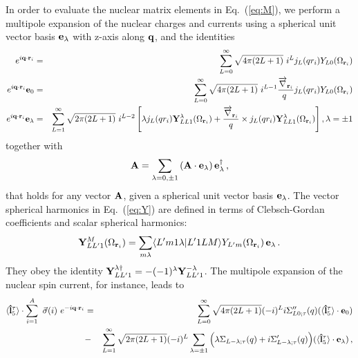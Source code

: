 \documentclass[11pt,a4paper]{article}
\begin{document}
In order to evaluate the nuclear matrix elements in Eq.~(\ref{eq:M}), we perform a multipole expansion of the nuclear charges and currents using a spherical unit vector basis ${\bf {e}}_\lambda$ with z-axis along ${\bf{q}}$, and the identities
\begin{eqnarray}
e^{i {\bf{q}} \cdot {\bf{r}}_i} &=& \sum_{L=0}^\infty \sqrt{4 \pi(2L+1)}~ i^L j_L(q r_i) Y_{L0}(\Omega_{{\bf{r}}_i}) \nonumber \\
e^{i {\bf{q}} \cdot {\bf{r}}_i} {\bf{e}}_{0} &=& \sum_{L=0}^\infty \sqrt{4 \pi(2L+1)}~ i^{L-1} {\overrightarrow{\nabla}_{{\bf{r}}_i} \over q\
} j_L(qr_i) Y_{L0}(\Omega_{{\bf{r}}_i})\nonumber\\
e^{i {\bf{q}} \cdot {\bf{r}}_i} {\bf{e}}_{\lambda} &=& \sum_{L = 1}^\infty \sqrt{2 \pi(2L+1)}~ i^{L-2} \left[
\lambda j_L(qr_i)  {\bf Y}_{LL1}^\lambda(\Omega_{{\bf{r}}_i}) +  { \overrightarrow{\nabla}_{{\bf{r}}_i} \over q} \times j_L(qr_i) {\bf Y}_{LL1}^\lambda
(\Omega_{{\bf{r}}_i}) \right],  \lambda=\pm 1\nonumber\\
\label{eq:Y}
\end{eqnarray}
together with 
\begin{equation}
{\bf{A}}=\sum_{\lambda=0,\pm1} \left( {\bf{A}} \cdot {\bf{e}}_{\lambda} \right) {\bf{e}}^{\dagger}_{\lambda}\,,
\end{equation}
that holds for any vector ${\bf{A}}$, given a spherical unit vector basis ${\bf {e}}_\lambda$. The vector spherical harmonics in Eq.~(\ref{eq:Y}) are defined in terms of Clebsch-Gordan coefficients and scalar spherical harmonics:
\begin{equation}
{\bf Y}^M_{LL'1}(\Omega_{{\bf{r}}_i}) = \sum_{m\lambda} \langle L'm1\lambda|L'1LM \rangle
Y_{L'm}(\Omega_{{\bf{r}}_i}) \, {\bf e}_\lambda \,.
\end{equation}
They obey the identity ${\bf Y}^{\lambda\dagger}_{LL'1}=-(-1)^{\lambda}{\bf Y}^{-\lambda}_{LL'1}$.
The multipole expansion of the nuclear spin current, for instance, leads to
\begin{eqnarray}
\langle{\bf{\hat{l}}}_5^\tau\rangle \cdot  \sum_{i=1}^A  ~\vec{\sigma}(i)~e^{-i {\bf{q}} \cdot {\bf{r}}_i} &=& \sum_{L=0}^{\infty}
\sqrt{4\pi (2L +1)}(-i)^{L}  i \Sigma''_{L0;\tau} (q)  (\langle{\bf{\hat{l}}}_5^\tau\rangle \cdot {\bf{e}}_0) \nonumber \\
&-&   \sum_{L=1}^{\infty}
\sqrt{2\pi (2L +1)}(-i)^{L} \sum_{\lambda=\pm1} \Big(\lambda \Sigma_{L-\lambda;\tau}(q)+i\Sigma'_{L-\lambda;\tau}(q)\Big)  (\langle{\bf{\hat{l}}}_5^\tau\rangle \cdot {\bf{e}}_\lambda) \,, \nonumber\\
\label{eq:l5}
\end{eqnarray}
\end{document}
